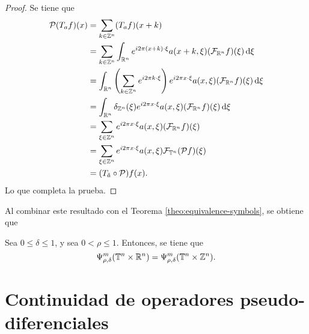 \begin{proof}
	Se tiene que 
	\begin{align*}
		\mathcal{P}(T_af)(x) & = \sum_{k\in\mathbb{Z}^n}(T_af)(x+k)\\
		& = \sum_{k\in\mathbb{Z}^n}\int_{\mathbb{R}^n} e^{i2\pi(x+k)\cdot\xi}a(x+k, \xi)(\mathcal{F}_{\mathbb{R}^n}f)(\xi) \mathop{}\!\mathrm{d} \xi \\
		& = \int_{\mathbb{R}^n}\left(\sum_{k\in\mathbb{Z}^n}e^{i2\pi k\cdot\xi}\right) e^{i2\pi x\cdot\xi}a(x, \xi)(\mathcal{F}_{\mathbb{R}^n}f)(\xi) \mathop{}\!\mathrm{d} \xi \\
		& = \int_{\mathbb{R}^n}\delta_{\mathbb{Z}^n}(\xi) e^{i2\pi x\cdot\xi}a(x, \xi)(\mathcal{F}_{\mathbb{R}^n}f)(\xi) \mathop{}\!\mathrm{d} \xi \\
		& = \sum_{\xi\in\mathbb{Z}^n}e^{i2\pi x\cdot\xi}a(x, \xi)(\mathcal{F}_{\mathbb{R}^n}f)(\xi) \\
		& = \sum_{\xi\in\mathbb{Z}^n}e^{i2\pi x\cdot\xi}a(x, \xi)\mathcal{F}_{\mathbb{T}^n}(\mathcal{P}f)(\xi)  \\
		& = (T_{\tilde{a}}\circ\mathcal{P})f(x).
	\end{align*}
	Lo que completa la prueba.
\end{proof}
Al combinar este resultado con el Teorema \ref{theo:equivalence-symbols}, se obtiene que 
\begin{corollary}
	Sea $0\leq\delta\leq1$, y sea $0<\rho\leq1$. Entonces, se tiene que 
	\begin{equation*}
		\Psi^m_{\rho,\delta}(\mathbb{T}^n\times\mathbb{R}^n) = \Psi^m_{\rho,\delta}(\mathbb{T}^n\times\mathbb{Z}^n).
	\end{equation*}
\end{corollary}

\chapter{Continuidad de operadores pseudo-diferenciales}

